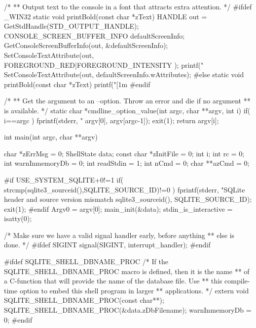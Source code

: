 \begin{Codex}[label=shell.c,numbers=left]
/*
** Output text to the console in a font that attracts extra attention.
*/
#ifdef _WIN32
static void printBold(const char *zText){
  HANDLE out = GetStdHandle(STD_OUTPUT_HANDLE);
  CONSOLE_SCREEN_BUFFER_INFO defaultScreenInfo;
  GetConsoleScreenBufferInfo(out, &defaultScreenInfo);
  SetConsoleTextAttribute(out,
         FOREGROUND_RED|FOREGROUND_INTENSITY
  );
  printf("%
  SetConsoleTextAttribute(out, defaultScreenInfo.wAttributes);
}
#else
static void printBold(const char *zText){
  printf("[1m%
}
#endif

/*
** Get the argument to an --option.  Throw an error and die if no argument
** is available.
*/
static char *cmdline_option_value(int argc, char **argv, int i){
  if( i==argc ){
    fprintf(stderr, "%
            argv[0], argv[argc-1]);
    exit(1);
  }
  return argv[i];
}

int main(int argc, char **argv){
  char *zErrMsg = 0;
  ShellState data;
  const char *zInitFile = 0;
  int i;
  int rc = 0;
  int warnInmemoryDb = 0;
  int readStdin = 1;
  int nCmd = 0;
  char **azCmd = 0;

#if USE_SYSTEM_SQLITE+0!=1
  if( strcmp(sqlite3_sourceid(),SQLITE_SOURCE_ID)!=0 ){
    fprintf(stderr, "SQLite header and source version mismatch\n%
            sqlite3_sourceid(), SQLITE_SOURCE_ID);
    exit(1);
  }
#endif
  Argv0 = argv[0];
  main_init(&data);
  stdin_is_interactive = isatty(0);

  /* Make sure we have a valid signal handler early, before anything
  ** else is done.
  */
#ifdef SIGINT
  signal(SIGINT, interrupt_handler);
#endif

#ifdef SQLITE_SHELL_DBNAME_PROC
  {
    /* If the SQLITE_SHELL_DBNAME_PROC macro is defined, then it is the name
    ** of a C-function that will provide the name of the database file.  Use
    ** this compile-time option to embed this shell program in larger
    ** applications. */
    extern void SQLITE_SHELL_DBNAME_PROC(const char**);
    SQLITE_SHELL_DBNAME_PROC(&data.zDbFilename);
    warnInmemoryDb = 0;
  }
#endif

}
\end{Codex}
